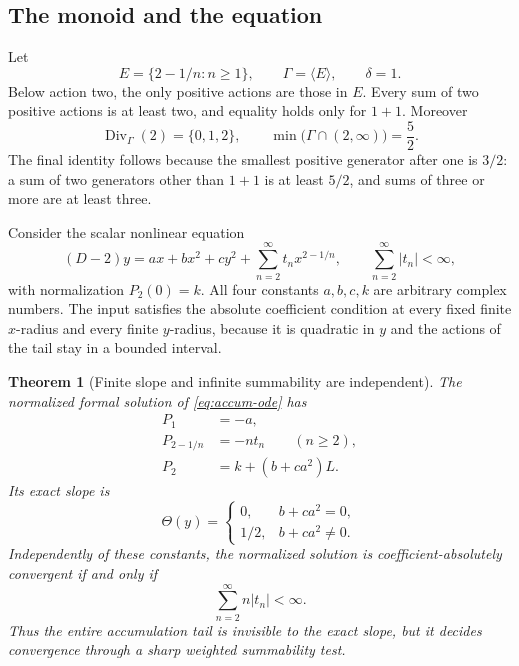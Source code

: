 \documentclass[11pt,a4paper]{article}
\numberwithin{equation}{section}
\newtheorem{theorem}{Theorem}[section]
\theoremstyle{definition}
\theoremstyle{remark}
\newcommand{\G}{\Gamma}
\newcommand{\Div}{\operatorname{Div}}
\begin{document}
\subsection{The monoid and the equation}
Let
\begin{equation}\label{eq:accum-monoid}
 E=\{2-1/n:n\ge1\},\qquad \G=\langle E\rangle,
 \qquad \delta=1.
\end{equation}
Below action two, the only positive actions are those in \(E\).
Every sum of two positive actions is at least two, and equality holds
only for \(1+1\). Moreover
\begin{equation}\label{eq:accum-divisors}
 \Div_\G(2)=\{0,1,2\},\qquad
 \min\bigl(\G\cap(2,\infty)\bigr)=\frac52.
\end{equation}
The final identity follows because the smallest positive generator
after one is \(3/2\): a sum of two generators other than \(1+1\)
is at least \(5/2\), and sums of three or more are at least three.

Consider the scalar nonlinear equation
\begin{equation}\label{eq:accum-ode}
 (D-2)y=a x+b x^2+c y^2+
          \sum_{n=2}^{\infty}t_n x^{2-1/n},
 \qquad \sum_{n=2}^{\infty}|t_n|<\infty,
\end{equation}
with normalization \(P_2(0)=k\). All four constants
\(a,b,c,k\) are arbitrary complex numbers. The input satisfies the
absolute coefficient condition at every fixed finite \(x\)-radius
and every finite \(y\)-radius, because it is quadratic in \(y\)
and the actions of the tail stay in a bounded interval.

\begin{theorem}[Finite slope and infinite summability are independent]
\label{thm:sharp-family}
The normalized formal solution of \eqref{eq:accum-ode} has
\begin{align}
 P_1&=-a,\label{eq:family-P1}\\
 P_{2-1/n}&=-nt_n\qquad(n\ge2),\label{eq:family-Pn}\\
 P_2&=k+(b+ca^2)L.\label{eq:family-P2}
\end{align}
Its exact slope is
\begin{equation}\label{eq:family-slope}
 \boxed{\displaystyle
 \Theta(y)=
 \begin{cases}
 0,&b+ca^2=0,\\
 1/2,&b+ca^2\ne0.
 \end{cases}}
\end{equation}
Independently of these constants, the normalized solution is
coefficient-absolutely convergent if and only if
\begin{equation}\label{eq:family-threshold}
 \boxed{\displaystyle \sum_{n=2}^{\infty}n|t_n|<\infty.}
\end{equation}
Thus the entire accumulation tail is invisible to the exact slope,
but it decides convergence through a sharp weighted summability test.
\end{theorem}
\end{document}

